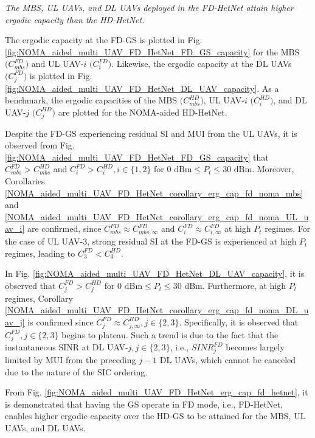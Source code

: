 \begin{observation}
\emph{\emph{The MBS, UL UAVs, and DL UAVs deployed in the FD-HetNet attain higher ergodic capacity than the HD-HetNet.}}
\end{observation}

The ergodic capacity at the FD-GS is plotted in Fig. \ref{fig:NOMA_aided_multi_UAV_FD_HetNet_FD_GS_capacity} for the MBS $\big(C_{mbs}^{FD}\big)$ and UL UAV-$i$ $\big(C_{i}^{FD}\big)$. Likewise, the ergodic capacity at the DL UAVs $\big(C_{j}^{FD}\big)$ is plotted in Fig. \ref{fig:NOMA_aided_multi_UAV_FD_HetNet_DL_UAV_capacity}. As a benchmark, the ergodic capacities of the MBS $\big(C_{mbs}^{HD}\big)$, UL UAV-$i$ $\big(C_{i}^{HD}\big)$, and DL UAV-$j$ $\big(C_{j}^{HD}\big)$ are plotted for the NOMA-aided HD-HetNet.

Despite the FD-GS experiencing residual SI and MUI from the UL UAVs, it is observed from Fig. \ref{fig:NOMA_aided_multi_UAV_FD_HetNet_FD_GS_capacity} that $C_{mbs}^{FD}>C_{mbs}^{HD}$ and $C_{i}^{FD}>C_{i}^{HD}, i \in \{1,2\}$ for $0\text{ dBm} \leq P_t \leq 30\text{ dBm}$. Moreover, Corollaries \ref{NOMA_aided_multi_UAV_FD_HetNet_corollary_erg_cap_fd_noma_mbs} and \ref{NOMA_aided_multi_UAV_FD_HetNet_corollary_erg_cap_fd_noma_UL_uav_i} are confirmed, since $C_{mbs}^{FD} \approx C_{mbs,\infty}^{FD}$ and $C_{i}^{FD} \approx C_{i,\infty}^{FD}$ at high $P_t$ regimes. For the case of UL UAV-3, strong residual SI at the FD-GS is experienced at high $P_t$ regimes, leading to $C_{3}^{FD}<C_{3}^{HD}$. 

In Fig. \ref{fig:NOMA_aided_multi_UAV_FD_HetNet_DL_UAV_capacity}, it is observed that $C_{j}^{FD}>C_{j}^{HD}$ for $0\text{ dBm} \leq P_t \leq 30\text{ dBm}$. Furthermore, at high $P_t$ regimes, Corollary \ref{NOMA_aided_multi_UAV_FD_HetNet_corollary_erg_cap_fd_noma_DL_uav_j} is confirmed since $C_{j}^{FD} \approx C_{j,\infty}^{HD}, j \in \{2,3\}$. Specifically, it is observed that $C_{j}^{FD}, j \in \{2,3\}$ begins to plateau. Such a trend is due to the fact that the instantaneous SINR at DL UAV-$j, j \in \{2,3\}$, i.e., $SINR_j^{FD}$ becomes largely limited by MUI from the preceding $j-1$ DL UAVs, which cannot be canceled due to the nature of the SIC ordering. 

From Fig. \ref{fig:NOMA_aided_multi_UAV_FD_HetNet_erg_cap_fd_hetnet}, it is demonstrated that having the GS operate in FD mode, i.e., FD-HetNet, enables higher ergodic capacity over the HD-GS to be attained for the MBS, UL UAVs, and DL UAVs.


